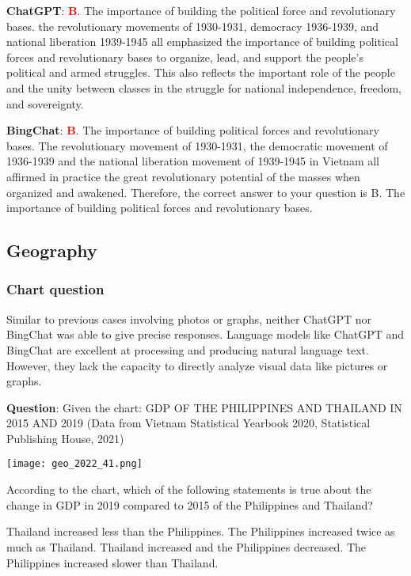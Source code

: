 \documentclass{article}
\begin{document}
{\begin{mdframed}[linewidth=1pt,linecolor=red]
		\textbf{ChatGPT}: \textcolor{red}{\textbf{B}}. The importance of building the political force and revolutionary bases. the revolutionary movements of 1930-1931, democracy 1936-1939, and national liberation 1939-1945 all emphasized the importance of building political forces and revolutionary bases to organize, lead, and support the people's political and armed struggles. This also reflects the important role of the people and the unity between classes in the struggle for national independence, freedom, and sovereignty.
		
		\textbf{BingChat}: \textcolor{red}{\textbf{B}}. The importance of building political forces and revolutionary bases. The revolutionary movement of 1930-1931, the democratic movement of 1936-1939 and the national liberation movement of 1939-1945 in Vietnam all affirmed in practice the great revolutionary potential of the masses when organized and awakened. Therefore, the correct answer to your question is B. The importance of building political forces and revolutionary bases.
		
	\end{mdframed}
	
	\subsection{Geography}
	
	\label{VNHSGE_Geo}
	
	\subsubsection{Chart question}
	
	\label{VNHSGE_Geo_Chart}
	
	Similar to previous cases involving photos or graphs, neither ChatGPT nor BingChat was able to give precise responses. Language models like ChatGPT and BingChat are excellent at processing and producing natural language text. However, they lack the capacity to directly analyze visual data like pictures or graphs.
	
	
	\begin{mdframed}[linewidth=1pt,linecolor=red] \textbf{Question}: Given the chart: GDP OF THE PHILIPPINES AND THAILAND IN 2015 AND 2019
		(Data from Vietnam Statistical Yearbook 2020, Statistical Publishing House, 2021)
		
		\texttt{[image: geo\_2022\_41.png]}
		
		According to the chart, which of the following statements is true about the change in GDP in 2019 compared to 2015 of the Philippines and Thailand?
		\begin{choices}
			\choice Thailand increased less than the Philippines.
			\choice The Philippines increased twice as much as Thailand.
			\choice Thailand increased and the Philippines decreased.
			\choice The Philippines increased slower than Thailand.
		\end{choices}
		

\end{mdframed}}
\end{document}
